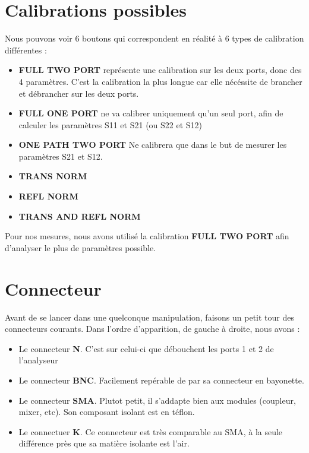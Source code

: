 \documentclass[a4paper,12pt]{report}            %
\begin{document}
\newpage

\section{Calibrations possibles}
Nous pouvons voir 6 boutons qui correspondent en réalité à 6 types de calibration
différentes :
\begin{itemize}
	\item \textbf{FULL TWO PORT} représente une calibration sur les deux ports, donc des 4 paramètres.
	      C'est la calibration la plus longue car elle nécéssite de brancher et débrancher sur les deux ports.
	\item \textbf{FULL ONE PORT} ne va calibrer uniquement qu'un seul port, afin de calculer les paramètres
	      S11 et S21 (ou S22 et S12)
	\item \textbf{ONE PATH TWO PORT} Ne calibrera que dans le but de mesurer les paramètres S21 et S12.
	\item \textbf{TRANS NORM} 
	\item \textbf{REFL NORM} 
	\item \textbf{TRANS AND REFL NORM}
\end{itemize}
Pour nos mesures, nous avons utilisé la calibration \textbf{FULL TWO PORT} afin
d'analyser le plus de paramètres possible.  

\section{Connecteur}

Avant de se lancer dans une quelconque manipulation, faisons un petit tour des connecteurs
courants. Dans l'ordre d'apparition, de gauche à droite, nous avons :
\begin{itemize}
	\item Le connecteur \textbf{N}. C'est sur celui-ci que débouchent les ports 1 et 2 de l'analyseur
	\item Le connecteur \textbf{BNC}. Facilement repérable de par sa connecteur en bayonette.
	\item Le connecteur \textbf{SMA}. Plutot petit, il s'addapte bien aux modules (coupleur, mixer, etc). Son
	      composant isolant est en téflon.
	\item Le connectuer \textbf{K}. Ce connecteur est très comparable au SMA, à la seule différence près
	      que sa matière isolante est l'air.
\end{itemize}
\end{document}
